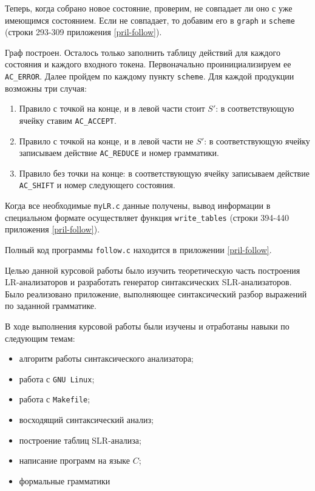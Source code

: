 \documentclass[bachelor, och, coursework, times]{SCWorks}
\begin{document}
Теперь, когда собрано новое состояние, проверим, не совпадает ли оно с уже имеющимся состоянием. Если не совпадает, то добавим его в \verb|graph| и \verb|scheme| (строки 293-309 приложения \ref{pril-follow}).

Граф построен. Осталось только заполнить таблицу действий для каждого состояния и каждого входного токена. Первоначально проинициализируем ее \verb|AC_ERROR|. Далее пройдем по каждому пункту \verb|scheme|. Для каждой продукции возможны три случая:
\begin{enumerate}
	\item Правило с точкой на конце, и в левой части стоит $S'$: в соответствующую ячейку ставим \verb|AC_ACCEPT|.
	\item Правило с точкой на конце, и в левой части не $S'$: в соответствующую ячейку записываем действие \verb|AC_REDUCE| и номер грамматики.
	\item Правило без точки на конце: в соответствующую ячейку записываем действие \verb|AC_SHIFT| и номер следующего состояния.
\end{enumerate}

Когда все необходимые \verb|myLR.c| данные получены, вывод информации в специальном формате осуществляет функция \verb|write_tables| (строки 394-440 приложения \ref{pril-follow}).

Полный код программы \verb|follow.c| находится в приложении \ref{pril-follow}.










\conclusion
Целью данной курсовой работы было изучить теоретическую часть построения LR-анализаторов и разработать генератор синтаксических SLR-анализаторов. Было реализовано приложение, выполняющее синтаксический разбор выражений по заданной грамматике.

В ходе выполнения курсовой работы были изучены и отработаны навыки по следующим темам:
\begin{itemize}
	\item алгоритм работы синтаксического анализатора;
	\item работа с \verb|GNU Linux|;
	\item работа с \verb|Makefile|;
	\item восходящий синтаксический анализ;
	\item построение таблиц SLR-анализа;
	\item написание программ на языке $C$;
	\item формальные грамматики
\end{itemize}
\end{document}
